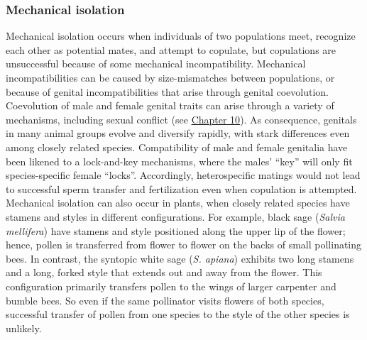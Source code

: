 \documentclass[
]{book}
\begin{document}
\hypertarget{mechanical-isolation}{%
\subsubsection*{Mechanical isolation}\label{mechanical-isolation}}

Mechanical isolation occurs when individuals of two populations meet, recognize each other as potential mates, and attempt to copulate, but copulations are unsuccessful because of some mechanical incompatibility. Mechanical incompatibilities can be caused by size-mismatches between populations, or because of genital incompatibilities that arise through genital coevolution. Coevolution of male and female genital traits can arise through a variety of mechanisms, including sexual conflict (see \href{social-behavior-and-sexual-selection.html\#sexual-conflict}{Chapter 10}). As consequence, genitals in many animal groups evolve and diversify rapidly, with stark differences even among closely related species. Compatibility of male and female genitalia have been likened to a lock-and-key mechanisms, where the males' ``key'' will only fit species-specific female ``locks''. Accordingly, heterospecific matings would not lead to successful sperm transfer and fertilization even when copulation is attempted. Mechanical isolation can also occur in plants, when closely related species have stamens and styles in different configurations. For example, black sage (\emph{Salvia mellifera}) have stamens and style positioned along the upper lip of the flower; hence, pollen is transferred from flower to flower on the backs of small pollinating bees. In contrast, the syntopic white sage (\emph{S. apiana}) exhibits two long stamens and a long, forked style that extends out and away from the flower. This configuration primarily transfers pollen to the wings of larger carpenter and bumble bees. So even if the same pollinator visits flowers of both species, successful transfer of pollen from one species to the style of the other species is unlikely.
\end{document}
